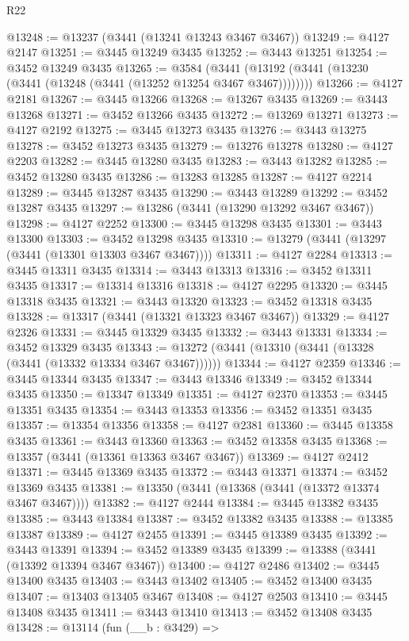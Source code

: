 \begin{lexlean}{R22}
\begin{coremodule}
@13248 := @13237 (@3441 (@13241 @13243 @3467 @3467))
@13249 := @4127 @2147
@13251 := @3445 @13249 @3435
@13252 := @3443 @13251
@13254 := @3452 @13249 @3435
@13265 := @3584
    (@3441 (@13192 (@3441 (@13230 (@3441 (@13248 (@3441 (@13252 @13254 @3467 @3467))))))))
@13266 := @4127 @2181
@13267 := @3445 @13266
@13268 := @13267 @3435
@13269 := @3443 @13268
@13271 := @3452 @13266 @3435
@13272 := @13269 @13271
@13273 := @4127 @2192
@13275 := @3445 @13273 @3435
@13276 := @3443 @13275
@13278 := @3452 @13273 @3435
@13279 := @13276 @13278
@13280 := @4127 @2203
@13282 := @3445 @13280 @3435
@13283 := @3443 @13282
@13285 := @3452 @13280 @3435
@13286 := @13283 @13285
@13287 := @4127 @2214
@13289 := @3445 @13287 @3435
@13290 := @3443 @13289
@13292 := @3452 @13287 @3435
@13297 := @13286 (@3441 (@13290 @13292 @3467 @3467))
@13298 := @4127 @2252
@13300 := @3445 @13298 @3435
@13301 := @3443 @13300
@13303 := @3452 @13298 @3435
@13310 := @13279 (@3441 (@13297 (@3441 (@13301 @13303 @3467 @3467))))
@13311 := @4127 @2284
@13313 := @3445 @13311 @3435
@13314 := @3443 @13313
@13316 := @3452 @13311 @3435
@13317 := @13314 @13316
@13318 := @4127 @2295
@13320 := @3445 @13318 @3435
@13321 := @3443 @13320
@13323 := @3452 @13318 @3435
@13328 := @13317 (@3441 (@13321 @13323 @3467 @3467))
@13329 := @4127 @2326
@13331 := @3445 @13329 @3435
@13332 := @3443 @13331
@13334 := @3452 @13329 @3435
@13343 := @13272 (@3441 (@13310 (@3441 (@13328 (@3441 (@13332 @13334 @3467 @3467))))))
@13344 := @4127 @2359
@13346 := @3445 @13344 @3435
@13347 := @3443 @13346
@13349 := @3452 @13344 @3435
@13350 := @13347 @13349
@13351 := @4127 @2370
@13353 := @3445 @13351 @3435
@13354 := @3443 @13353
@13356 := @3452 @13351 @3435
@13357 := @13354 @13356
@13358 := @4127 @2381
@13360 := @3445 @13358 @3435
@13361 := @3443 @13360
@13363 := @3452 @13358 @3435
@13368 := @13357 (@3441 (@13361 @13363 @3467 @3467))
@13369 := @4127 @2412
@13371 := @3445 @13369 @3435
@13372 := @3443 @13371
@13374 := @3452 @13369 @3435
@13381 := @13350 (@3441 (@13368 (@3441 (@13372 @13374 @3467 @3467))))
@13382 := @4127 @2444
@13384 := @3445 @13382 @3435
@13385 := @3443 @13384
@13387 := @3452 @13382 @3435
@13388 := @13385 @13387
@13389 := @4127 @2455
@13391 := @3445 @13389 @3435
@13392 := @3443 @13391
@13394 := @3452 @13389 @3435
@13399 := @13388 (@3441 (@13392 @13394 @3467 @3467))
@13400 := @4127 @2486
@13402 := @3445 @13400 @3435
@13403 := @3443 @13402
@13405 := @3452 @13400 @3435
@13407 := @13403 @13405 @3467
@13408 := @4127 @2503
@13410 := @3445 @13408 @3435
@13411 := @3443 @13410
@13413 := @3452 @13408 @3435
@13428 := @13114
    (fun (__b : @3429) =>

\end{coremodule}
\end{lexlean}
